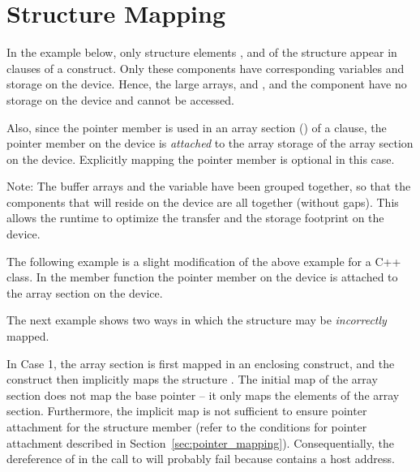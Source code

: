 \section{Structure Mapping}
\label{sec:structure_mapping}



In the example below, only structure elements ,  and
 of the  structure appear in  clauses of a
 construct. Only these components have corresponding variables
and storage on the device.  Hence, the large arrays,  and
, and the  component have no storage on the device
and cannot be accessed.

Also, since the pointer member  is used in an array section
() of a  clause, the pointer member
 on the device is \emph{attached} to the array storage of
the array section on the device. Explicitly mapping the pointer member
 is optional in this case.

Note: The buffer arrays and the  variable have been grouped together,
so that the components that will reside on the device are all together (without
gaps). This allows the runtime to optimize the transfer and the storage
footprint on the device.



The following example is a slight modification of the above example for a C++
class.  In the member function  the pointer member
 on the device is attached to the array section  on the
device.


The next example shows two ways in which the structure may be
\emph{incorrectly} mapped.

In Case 1, the array section  is first mapped in an enclosing
 construct, and the  construct then implicitly
maps the structure . The initial map of the array section does not
map the base pointer  -- it only maps the elements of the array
section.  Furthermore, the implicit map is not sufficient to ensure pointer
attachment for the structure member  (refer to the conditions for
pointer attachment described in Section~\ref{sec:pointer_mapping}).
Consequentially, the dereference of  in the call to
 will probably fail because  contains a host
address.

